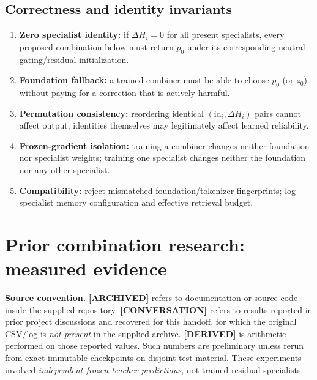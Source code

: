\documentclass[11pt,letterpaper]{article}
\newcommand{\tagg}[1]{\textsf{\footnotesize\color{sea}\textbf{[#1]}}}
\newcommand{\infobox}[1]{\noindent\colorbox{pale}{\parbox{\dimexpr\linewidth-2\fboxsep\relax}{\small #1}}\par}
\begin{document}
\subsection{Correctness and identity invariants}
\begin{enumerate}
\item \textbf{Zero specialist identity:} if $\Delta H_i=0$ for all present specialists, every proposed combination below must return $p_0$ under its corresponding neutral gating/residual initialization.
\item \textbf{Foundation fallback:} a trained combiner must be able to choose $p_0$ (or $z_0$) without paying for a correction that is actively harmful.
\item \textbf{Permutation consistency:} reordering identical $(\mathrm{id}_i,\Delta H_i)$ pairs cannot affect output; identities themselves may legitimately affect learned reliability.
\item \textbf{Frozen-gradient isolation:} training a combiner changes neither foundation nor specialist weights; training one specialist changes neither the foundation nor any other specialist.
\item \textbf{Compatibility:} reject mismatched foundation/tokenizer fingerprints; log specialist memory configuration and effective retrieval budget.
\end{enumerate}

\section{Prior combination research: measured evidence}
\label{sec:results}
\infobox{\textbf{Source convention.} \tagg{ARCHIVED} refers to documentation or source code inside the supplied repository. \tagg{CONVERSATION} refers to results reported in prior project discussions and recovered for this handoff, for which the original CSV/log is \emph{not present} in the supplied archive. \tagg{DERIVED} is arithmetic performed on those reported values. Such numbers are preliminary unless rerun from exact immutable checkpoints on disjoint test material. These experiments involved \emph{independent frozen teacher predictions}, not trained residual specialists.}
\end{document}
